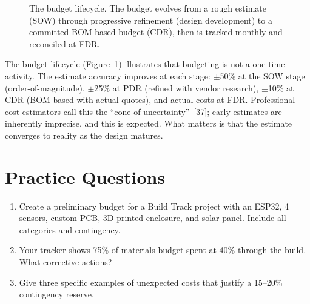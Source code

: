 \begin{figure}[htbp]
\centering
{}
\caption{The budget lifecycle. The budget evolves from a rough estimate (SOW) through progressive refinement (design development) to a committed BOM-based budget (CDR), then is tracked monthly and reconciled at FDR.}\label{fig:budget-lifecycle}
\end{figure}

The budget lifecycle (Figure~\ref{fig:budget-lifecycle}) illustrates that budgeting is not a one-time activity. The estimate accuracy improves at each stage: $\pm$50\% at the SOW stage (order-of-magnitude), $\pm$25\% at PDR (refined with vendor research), $\pm$10\% at CDR (BOM-based with actual quotes), and actual costs at FDR. Professional cost estimators call this the ``cone of uncertainty''~[37]; early estimates are inherently imprecise, and this is expected. What matters is that the estimate converges to reality as the design matures.


\section{Practice Questions}
\begin{enumerate}[leftmargin=1.5em]
\item Create a preliminary budget for a Build Track project with an ESP32, 4 sensors, custom PCB, 3D-printed enclosure, and solar panel. Include all categories and contingency.
\item Your tracker shows 75\% of materials budget spent at 40\% through the build. What corrective actions?
\item Give three specific examples of unexpected costs that justify a 15--20\% contingency reserve.
\end{enumerate}


